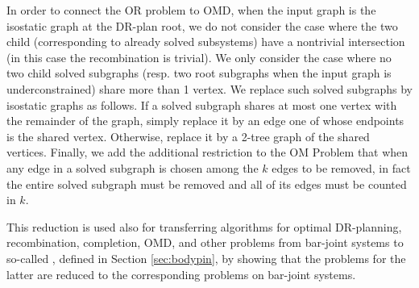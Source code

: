 In order to connect the OR problem to OMD, when the input graph is the isostatic graph at the DR-plan root, we do not consider the case where the two child  (corresponding to already solved subsystems) have a nontrivial intersection (in this case the recombination is trivial). We only consider the case where no two child solved subgraphs (resp. two root subgraphs when the input graph is underconstrained) share more than 1 vertex. We replace such solved subgraphs  by isostatic graphs as follows. If a solved subgraph shares at most one vertex with the remainder of the graph, simply replace it by an edge one of whose endpoints  is the shared vertex. Otherwise, replace it by  a 2-tree graph of the shared vertices. Finally, we add the additional restriction to the OM Problem that when any edge in a solved subgraph is chosen among the $k$ edges to be removed, in fact the entire solved subgraph must be removed  and all of its edges must be counted in $k$.

This reduction is used also for transferring  algorithms for optimal DR-planning, recombination, completion, OMD, and other problems from bar-joint systems to so-called , defined in Section \ref{sec:bodypin}, by showing that the problems for the latter are reduced to the corresponding problems on bar-joint systems.

